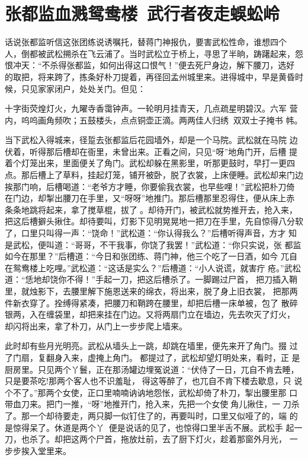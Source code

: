 \chapter{张都监血溅鸳鸯楼~武行者夜走蜈蚣岭}

话说张都监听信这张团练说诱嘱托，替蒋门神报仇，要害武松性命，谁想四个
人，倒都被武松搠杀在飞云浦了。当时武松立于桥上，寻思了半晌，踌躇起来，怨
恨冲天：“不杀得张都监，如何出得这口恨气！”便去死尸身边，解下腰刀，选好
的取把，将来跨了，拣条好朴刀提着，再径回孟州城里来。进得城中，早是黄昏时
候，只见家家闭户，处处关门。但见：

十字街荧煌灯火，九曜寺香霭钟声。一轮明月挂青天，几点疏星明碧汉。六军
营内，呜呜画角频吹；五鼓楼头，点点铜壶正滴。两两佳人归绣，双双士子掩书
帏。

当下武松入得城来，径踅去张都监后花园墙外，却是一个马院。武松就在马院
边伏着，听得那后槽却在衙里，未曾出来。正看之间，只见“呀”地角门开，后槽
提着个灯笼出来，里面便关了角门。武松却躲在黑影里，听那更鼓时，早打一更四
点。那后槽上了草料，挂起灯笼，铺开被卧，脱了衣裳，上床便睡。武松却来门边
挨那门响，后槽喝道：“老爷方才睡，你要偷我衣裳，也早些哩！”武松把朴刀倚
在门边，却掣出腰刀在手里，又“呀呀”地推门。那后槽那里忍得住，便从床上赤
条条地跳将起来，拿了搅草棍，拔了。却待开门，被武松就势推开去，抢入来，
把这后槽擗头揪住。却待要叫，灯影下见明晃晃地一把刀在手里，先自惊得八分软
了，口里只叫得一声：“饶命！”武松道：“你认得我么？”后槽听得声音，方才
知是武松，便叫道：“哥哥，不干我事，你饶了我罢！”武松道：“你只实说，张
都监如今在那里？”后槽道：“今日和张团练、蒋门神，他三个吃了一日酒，如今
兀自在鸳鸯楼上吃哩。”武松道：“这话是实么？”后槽道：“小人说谎，就害疔
疮。”武松道：“恁地却饶你不得！”手起一刀，把这后槽杀了。一脚踢过尸首，
把刀插入鞘里，就烛影下，去腰里解下施恩送来的绵衣，将出来，脱了身上旧衣裳，
把那两件新衣穿了。拴缚得紧凑，把腰刀和鞘跨在腰里，却把后槽一床单被，包了
散碎银两，入在缠袋里，却把来挂在门边。又将两扇门立在墙边，先去吹灭了灯火，
却闪将出来，拿了朴刀，从门上一步步爬上墙来。

此时却有些月光明亮。武松从墙头上一跳，却跳在墙里，便先来开了角门。掇
过了门扇，复翻身入来，虚掩上角门。都提过了，武松却望灯明处来，看时，正
是厨房里。只见两个丫鬟，正在那汤罐边埋冤说道：“伏侍了一日，兀自不肯去睡，
只是要茶吃!那两个客人也不识羞耻，得这等醉了，也兀自不肯下楼去歇息，只
说个不了。”那两个女使，正口里喃喃讷讷地怨怅，武松却倚了朴刀，掣出腰里那
口带血刀来。把门一推，“呀”地推开门，抢入来，先把一个女使角儿揪住，一
刀杀了。那一个却待要走，两只脚一似钉住了的，再要叫时，口里又似哑了的，端
的是惊得呆了。休道是两个丫，便是说话的见了，也惊得口里半舌不展。武松手
起一刀，也杀了。却把这两个尸首，拖放灶前，去了厨下灯火，趁着那窗外月光，
一步步挨入堂里来。

